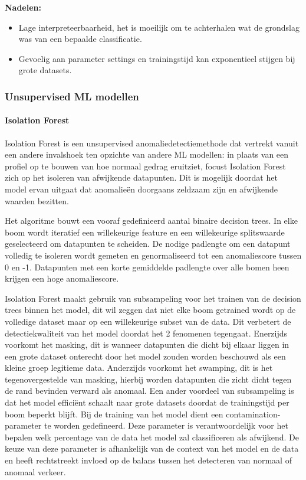 \textbf{Nadelen:}
\begin{itemize}
    \item Lage interpreteerbaarheid, het is moeilijk om te achterhalen wat de
    grondslag was van een bepaalde classificatie.
    \item Gevoelig aan parameter settings en trainingstijd kan exponentieel
    stijgen bij grote datasets.
\end{itemize}

\medskip

\subsubsection{Unsupervised ML modellen}

\paragraph{Isolation Forest}

Isolation Forest is een unsupervised anomaliedetectiemethode dat vertrekt vanuit een andere invalshoek ten opzichte van andere ML modellen: in plaats van een profiel op te bouwen van hoe normaal gedrag eruitziet, focust Isolation Forest zich op het isoleren van afwijkende datapunten. 
Dit is mogelijk doordat het model ervan uitgaat dat anomalieën doorgaans zeldzaam zijn en afwijkende waarden bezitten\autocite{Liu2008}.

Het algoritme bouwt een vooraf gedefinieerd aantal binaire decision trees. 
In elke boom wordt iteratief een willekeurige feature en een willekeurige splitswaarde geselecteerd om datapunten te scheiden. 
De nodige padlengte om een datapunt volledig te isoleren wordt gemeten en genormaliseerd tot een anomaliescore tussen 0 en -1.
Datapunten met een korte gemiddelde padlengte over alle bomen heen krijgen een hoge anomaliescore\autocite{Lesouple2021}.

Isolation Forest maakt gebruik van subsampeling voor het trainen van de decision trees binnen het model, dit wil zeggen dat niet elke boom getrained wordt op de volledige dataset maar op een willekeurige subset van de data.
Dit verbetert de detectiekwaliteit van het model doordat het 2 fenomenen tegengaat. 
Enerzijds voorkomt het masking, dit is wanneer datapunten die dicht bij elkaar liggen in een grote dataset onterecht door het model zouden worden beschouwd als een kleine groep legitieme data. 
Anderzijds voorkomt het swamping, dit is het tegenovergestelde van masking, hierbij worden datapunten die zicht dicht tegen de rand bevinden verward als anomaal. 
Een ander voordeel van subsampeling is dat het model efficiënt schaalt naar grote datasets doordat de trainingstijd per boom beperkt blijft. 
Bij de training van het model dient een contamination-parameter te worden gedefineerd. Deze parameter is verantwoordelijk voor het bepalen welk percentage van de data het model zal classificeren als afwijkend.
De keuze van deze parameter is afhankelijk van de context van het model en de data en heeft rechtstreekt invloed op de balans tussen het detecteren van normaal of anomaal verkeer\autocite{Liu2008}. 

